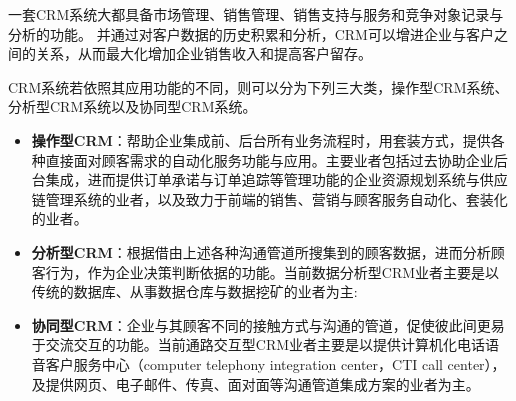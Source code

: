 \documentclass[lang=cn,11pt,numbers]{elegantpaper}
\begin{document}
一套CRM系统大都具备市场管理、销售管理、销售支持与服务和竞争对象记录与分析的功能。
并通过对客户数据的历史积累和分析，CRM可以增进企业与客户之间的关系，从而最大化增加企业销售收入和提高客户留存。


CRM系统若依照其应用功能的不同，则可以分为下列三大类，操作型CRM系统、分析型CRM系统以及协同型CRM系统。

\begin{itemize}
\item \textbf{操作型CRM}：帮助企业集成前、后台所有业务流程时，用套装方式，提供各种直接面对顾客需求的自动化服务功能与应用。主要业者包括过去协助企业后台集成，进而提供订单承诺与订单追踪等管理功能的企业资源规划系统与供应链管理系统的业者，以及致力于前端的销售、营销与顾客服务自动化、套装化的业者。

\item \textbf{分析型CRM}：根据借由上述各种沟通管道所搜集到的顾客数据，进而分析顾客行为，作为企业决策判断依据的功能。当前数据分析型CRM业者主要是以传统的数据库、从事数据仓库与数据挖矿的业者为主:

\item \textbf{协同型CRM}：企业与其顾客不同的接触方式与沟通的管道，促使彼此间更易于交流交互的功能。当前通路交互型CRM业者主要是以提供计算机化电话语音客户服务中心（computer telephony integration center，CTI call center），及提供网页、电子邮件、传真、面对面等沟通管道集成方案的业者为主。

\end{itemize}
\nocite{*}

\end{document}
